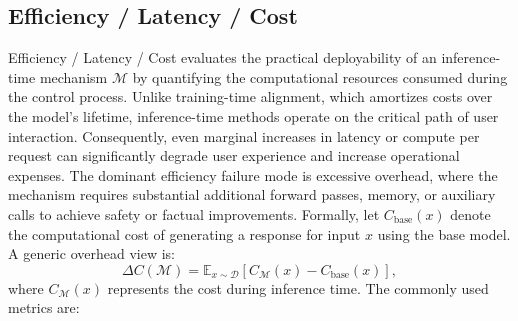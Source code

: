 \subsection{Efficiency / Latency / Cost}
Efficiency / Latency / Cost evaluates the practical deployability of an inference-time mechanism $\mathcal{M}$ by quantifying the computational resources consumed during the control process. Unlike training-time alignment, which amortizes costs over the model's lifetime, inference-time methods operate on the critical path of user interaction. Consequently, even marginal increases in latency or compute per request can significantly degrade user experience and increase operational expenses. The dominant efficiency failure mode is excessive overhead, where the mechanism requires substantial additional forward passes, memory, or auxiliary calls to achieve safety or factual improvements. Formally, let $C_{\text{base}}(x)$ denote the computational cost of generating a response for input $x$ using the base model. A generic overhead view is:
\[
\Delta C(\mathcal{M})
=
\mathbb{E}_{x\sim \mathcal{D}}\!\left[ C_{\mathcal{M}}(x) - C_{\text{base}}(x) \right],
\]
where $C_{\mathcal{M}}(x)$ represents the cost during inference time. The commonly used metrics are:

